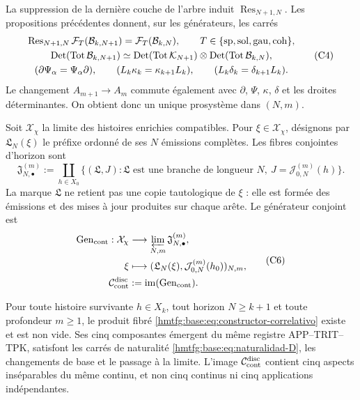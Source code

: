La suppression de la dernière couche de l'arbre induit
\(\operatorname{Res}_{N+1,N}\). Les propositions précédentes donnent, sur les
générateurs, les carrés
\[
\begin{gathered}
 \operatorname{Res}_{N+1,N}\mathcal F_T(\mathcal B_{k,N+1})
 =\mathcal F_T(\mathcal B_{k,N}),
 \qquad T\in\{{\rm sp},{\rm sol},{\rm gau},{\rm coh}\},\\
 \operatorname{Det}(\operatorname{Tot}\mathcal B_{k,N+1})
 \simeq
 \operatorname{Det}(\operatorname{Tot}\mathcal K_{N+1})
 \otimes
 \operatorname{Det}(\operatorname{Tot}\mathcal B_{k,N}),\\
 (\partial\Psi_\alpha=\Psi_\alpha\partial),\qquad
 (L_k\kappa_k=\kappa_{k+1}L_k),\qquad
 (L_k\delta_k=\delta_{k+1}L_k).
\end{gathered}
 \tag{C4}
 \label{hmtfg:base:eq:naturalidad-D}
\]
Le changement \(A_{m+1}\to A_m\) commute également avec \(\partial\), \(\Psi\),
\(\kappa\), \(\delta\) et les droites déterminantes. On obtient donc
un unique prosystème dans \((N,m)\).

Soit \(\mathcal X_\chi\) la limite des histoires enrichies compatibles. Pour \(\xi\in\mathcal X_\chi\), désignons par \(\mathfrak L_N(\xi)\) le préfixe ordonné de ses \(N\) émissions complètes. Les fibres conjointes d'horizon sont
\[
 \mathfrak J_{N,\bullet}^{(m)}
 :=\coprod_{h\in X_0}
 \{(\mathfrak L,J):\mathfrak L\text{ est une branche de longueur }N,
       \ J=\mathcal J_{0,N}^{(m)}(h)\}.
 \tag{C5}
 \label{hmtfg:base:eq:fibras-conjuntas-horizonte}
\]
La marque \(\mathfrak L\) ne retient pas une copie tautologique de \(\xi\) : elle est
formée des émissions et des mises à jour produites sur chaque arête. Le
générateur conjoint est
\[
\begin{aligned}
 \operatorname{Gen}_{\rm cont}:\mathcal X_\chi
   &\longrightarrow\varprojlim_{N,m}\mathfrak J_{N,\bullet}^{(m)},\\
 \xi&\longmapsto
   (\mathfrak L_N(\xi),\mathcal J_{0,N}^{(m)}(h_0))_{N,m},\\
 \mathcal C_{\rm cont}^{\rm disc}
   &:=\operatorname{im}(\operatorname{Gen}_{\rm cont}).
\end{aligned}
 \tag{C6}
 \label{hmtfg:base:eq:continuo-discreto}
\]

\begin{theorem}
\label{hmtfg:base:thm:correlacion-cinco}
Pour toute histoire survivante \(h\in X_k\), tout horizon
\(N\geq k+1\) et toute profondeur \(m\geq1\), le produit fibré
\eqref{hmtfg:base:eq:constructor-correlativo} existe et est non vide. Ses cinq
composantes émergent du même registre APP--TRIT--TPK, satisfont les
carrés de naturalité \eqref{hmtfg:base:eq:naturalidad-D}, les changements de base et le
passage à la limite. L'image \(\mathcal C_{\rm cont}^{\rm disc}\) contient cinq
aspects inséparables du même continu, et non cinq continus ni cinq
applications indépendantes.
\end{theorem}

